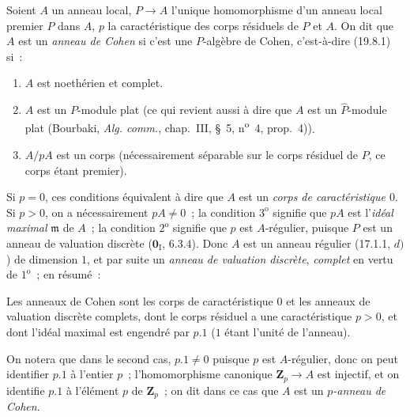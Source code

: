 
\begin{definition}[19.8.4]
\label{0.19.8.4-fr}
Soient $A$ un anneau local, $P\to A$ l'unique homomorphisme d'un anneau local
premier $P$ dans $A$, $p$ la caractéristique des corps résiduels de $P$ et
$A$. On dit que $A$ est un \emph{anneau de Cohen} si c'est une $P$-algèbre de
Cohen, c'est-à-dire \textup{(19.8.1)} si~:
\begin{enumerate}
  \item[$1^{\mathrm o}$] $A$ est noethérien et complet.
  \item[$2^{\mathrm o}$] $A$ est un $P$-module plat \textup{(ce qui revient aussi à
  dire que $A$ est un $\widehat P$-module plat (Bourbaki, \emph{Alg. comm.},
  chap.~III, §~5, n\textsuperscript{o}~4, prop.~4))}.
  \item[$3^{\mathrm o}$] $A/pA$ est un corps \textup{(nécessairement séparable sur le
  corps résiduel de $P$, ce corps étant premier)}.
\end{enumerate}
\end{definition}

Si $p=0$, ces conditions équivalent à dire que $A$ est un \emph{corps de
caractéristique $0$}. Si $p>0$, on a nécessairement $pA\neq0$~; la condition
$3^{\mathrm o}$ signifie que $pA$ est l'\emph{idéal maximal} $\mathfrak m$ de $A$~;
la condition $2^{\mathrm o}$ signifie que $p$ est $A$-régulier, puisque $P$
est un anneau de valuation discrète ($\mathbf 0_{\mathrm I}$, 6.3.4). Donc $A$
est un anneau régulier (17.1.1, $d)$) de dimension $1$, et par suite un \emph{anneau
de valuation discrète}, \emph{complet} en vertu de $1^{\mathrm o}$~; en résumé~:

\begin{proposition}[19.8.5]
\label{0.19.8.5-fr}
Les anneaux de Cohen sont les corps de caractéristique $0$ et les anneaux de
valuation discrète complets, dont le corps résiduel a une caractéristique
$p>0$, et dont l'idéal maximal est engendré par $p.1$ ($1$ étant l'unité de
l'anneau).
\end{proposition}

On notera que dans le second cas, $p.1\neq0$ puisque $p$ est $A$-régulier,
donc on peut identifier $p.1$ à l'entier $p$~; l'homomorphisme canonique
$\mathbf Z_p\to A$ est injectif, et on identifie $p.1$ à l'élément $p$ de
$\mathbf Z_p$~; on dit dans ce cas que $A$ est un \emph{$p$-anneau de Cohen}.

